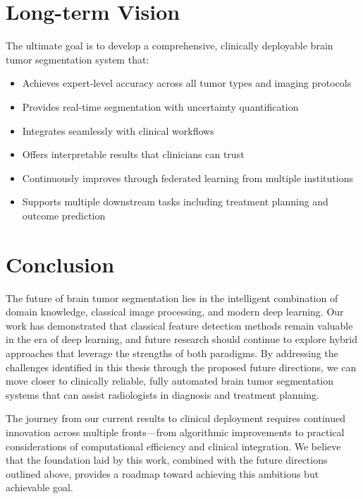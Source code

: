 \section{Long-term Vision}

The ultimate goal is to develop a comprehensive, clinically deployable brain tumor segmentation system that:

\begin{itemize}
    \item Achieves expert-level accuracy across all tumor types and imaging protocols
    \item Provides real-time segmentation with uncertainty quantification
    \item Integrates seamlessly with clinical workflows
    \item Offers interpretable results that clinicians can trust
    \item Continuously improves through federated learning from multiple institutions
    \item Supports multiple downstream tasks including treatment planning and outcome prediction
\end{itemize}

\section{Conclusion}

The future of brain tumor segmentation lies in the intelligent combination of domain knowledge, classical image processing, and modern deep learning. Our work has demonstrated that classical feature detection methods remain valuable in the era of deep learning, and future research should continue to explore hybrid approaches that leverage the strengths of both paradigms. By addressing the challenges identified in this thesis through the proposed future directions, we can move closer to clinically reliable, fully automated brain tumor segmentation systems that can assist radiologists in diagnosis and treatment planning.

The journey from our current results to clinical deployment requires continued innovation across multiple fronts—from algorithmic improvements to practical considerations of computational efficiency and clinical integration. We believe that the foundation laid by this work, combined with the future directions outlined above, provides a roadmap toward achieving this ambitious but achievable goal.